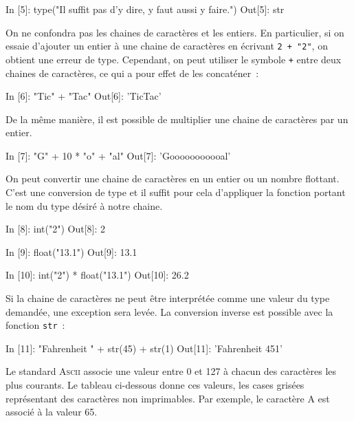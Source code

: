\documentclass{magnolia}
\begin{document}
\begin{pythoncode}
In [5]: type("Il suffit pas d'y dire, y faut aussi y faire.")
Out[5]: str
\end{pythoncode}

\noindent
On ne confondra pas les chaines de caractères et les entiers. En particulier, si on
essaie d'ajouter un entier à une chaine de caractères en écrivant \og\verb_2 + "2"_\fg,
on obtient une erreur de type. Cependant, on peut utiliser le symbole \verb_+_ entre
deux chaines de caractères, ce qui a pour effet de les concaténer~:

\begin{pythoncode}
In [6]: "Tic" + "Tac"
Out[6]: 'TicTac'
\end{pythoncode}

\noindent
De la même manière, il est possible de multiplier une chaine de caractères par un entier.

\begin{pythoncode}
In [7]: "G" + 10 * "o" + "al"
Out[7]: 'Gooooooooooal'
\end{pythoncode}

On peut convertir une chaine de caractères en un entier ou un nombre flottant.
C'est une conversion de type et il suffit
pour cela d'appliquer la fonction portant le nom du type désiré à notre chaine.


\begin{pythoncode}
In [8]: int("2")
Out[8]: 2

In [9]: float("13.1")
Out[9]: 13.1

In [10]: int("2") * float("13.1")
Out[10]: 26.2   
\end{pythoncode}

\noindent Si la chaine de caractères ne peut être interprétée comme une valeur du type demandée, une exception sera
levée. La conversion inverse est possible avec la fonction \verb_str_~:

\begin{pythoncode}
In [11]: "Fahrenheit " + str(45) + str(1)
Out[11]: 'Fahrenheit 451'
\end{pythoncode}

Le standard \textsc{Ascii} associe une valeur entre 0 et 127 à chacun des caractères les plus courants.
Le tableau ci-dessous donne ces valeurs, les cases grisées représentant des caractères non imprimables.
Par exemple, le caractère A est associé à la valeur 65.
\end{document}
